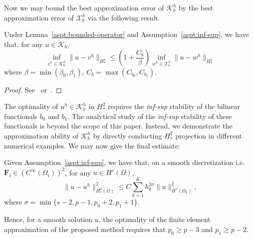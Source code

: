 Now we may bound the best approximation error of $\mathcal{K}_b^h$ by the best approximation error of $\mathcal{X}_b^h$ via the following result.
\begin{theorem}
  Under Lemma~\ref{aspt:bounded-operator} and Assumption~\ref{aspt:inf-sup}, we have that, for any $u\in\mathcal{K}_b$,
  \begin{equation}
    \inf_{v^h\in{\mathcal{K}_b^h}}\|{u-v^h}\|_{H^2_*}\leq\left({1+\frac{C_b}{\beta}}\right)\inf_{w^h\in{\mathcal{X}_b^h}}\|{u-w^h}\|_{H^2_*}
  \end{equation}
  where $\beta=\min\left({\beta_{0},\beta_{1}}\right)$, $C_b=\max\left({C_{b_0},C_{b_1}}\right)$.
  \begin{proof}
    See~\cite{brenner_mathematical_2007} or~\cite{boffi_mixed_2013}.
  \end{proof}
\end{theorem}

The optimality of $u^h\in\mathcal{K}_b^h$ in $H^2_*$ requires the \textit{inf-sup} stability of the bilinear functionals $b_0$ and $b_1$. The analytical study of the \textit{inf-sup} stability of these functionals is beyond the scope of this paper. Instead, we demonstrate the approximation ability of $\mathcal{K}_b^h$ by directly conducting $H^2_*$ projection in different numerical examples. We may now give the final estimate:
\begin{theorem}\label{thm:approximation-of-bezier-formulation}
  Given Assumption~\ref{aspt:inf-sup}, we have that, on a smooth discretization i.e. $\mathbf{F}_i\in \left(C^\infty(\Omega_i)\right)^2$, for any $u\in H^s(\Omega)$,
  \begin{equation}
    \|u-u^h\|_{H^2_*(\Omega)}^2 \leq C \sum_{k=1}^K h_k^{2\sigma}\|u\|^2_{H^s(\Omega_k)},
  \end{equation}
  where $\sigma=\min\{s-2,p-1,p_0+2,p_1+1\}$.
\end{theorem}
Hence, for a smooth solution $u$, the optimality of the finite element approximation of the proposed method requires that $p_0\geq p-3$ and $p_1\geq p-2$.

